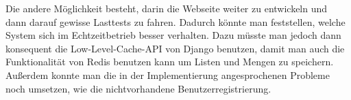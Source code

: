 Die andere Möglichkeit besteht, darin die Webseite weiter zu entwickeln und
dann darauf gewisse Lasttests zu fahren. Dadurch könnte man feststellen, welche
System sich im Echtzeitbetrieb besser verhalten. Dazu müsste man jedoch dann
konsequent die Low-Level-Cache-API von Django benutzen, damit man auch die
Funktionalität von Redis benutzen kann um Listen und Mengen zu speichern.
Außerdem konnte man die in der Implementierung angesprochenen Probleme noch
umsetzen, wie die nichtvorhandene Benutzerregistrierung.
